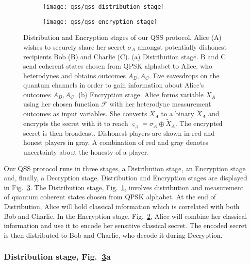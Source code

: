 \begin{figure}[htp]
\captionsetup{width=0.8\linewidth}
\centering
	\begin{subfigure}{0.8\linewidth}
		\centering
		\label{fig:qss_distribution_stage}
		\texttt{[image: qss/qss\_distribution\_stage]}
	\end{subfigure}
	\begin{subfigure}{0.8\linewidth}
		\centering
		\label{fig:qss_encryption_stage}
		\texttt{[image: qss/qss\_encryption\_stage]}
		
	\end{subfigure}
\caption{\label{fig:qss_protocol_cartoon} Distribution and Encryption stages of our QSS protocol. Alice (A) wishes to securely share her secret $\sigma_A$ amongst potentially dishonest recipients Bob (B) and Charlie (C). (a) Distribution stage. B and C send coherent states chosen from QPSK alphabet to Alice, who heterodynes and obtains outcomes $A_B, A_C$. Eve eavesdrops on the quantum channels in order to gain information about Alice's outcomes $A_B, A_C$. (b) Encryption stage. Alice forms variable $X_A$ using her chosen function $\mathcal{F}$ with her heterodyne measurement outcomes as input variables. She converts $X_A$ to a binary $\tilde{X}_A$ and encrypts the secret with it to reach $\varsigma_A = \sigma_A \oplus \tilde{X}_A$. The encrypted secret is then broadcast. Dishonest players are shown in red and honest players in gray. A combination of red and gray denotes uncertainty about the honesty of a player.
}
\end{figure}


Our QSS protocol runs in three stages, a Distribution stage, an Encryption stage and, finally, a Decryption stage. Distribution and Encryption stages are displayed in Fig.~\ref{fig:qss_protocol_cartoon}. The Distribution stage, Fig.~\ref{fig:qss_distribution_stage}, involves distribution and measurement of quantum coherent states chosen from QPSK alphabet. At the end of Distribution, Alice will hold classical information which is correlated with both Bob and Charlie. In the Encryption stage, Fig.~\ref{fig:qss_encryption_stage}, Alice will combine her classical information and use it to encode her sensitive classical secret. The encoded secret is then distributed to Bob and Charlie, who decode it during Decryption. 


\subsubsection*{Distribution stage, Fig.~\ref{fig:qss_protocol_cartoon}a}

